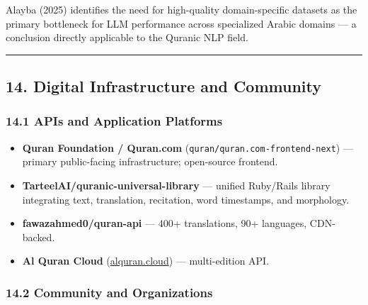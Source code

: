 \documentclass[12pt,a4paper]{article}
\providecommand{\tightlist}{\setlength{\itemsep}{0pt}\setlength{\parskip}{0pt}}
\begin{document}
Alayba (2025) identifies the need for high-quality domain-specific
datasets as the primary bottleneck for LLM performance across
specialized Arabic domains --- a conclusion directly applicable to the
Quranic NLP field.

\begin{center}\rule{0.5\linewidth}{0.5pt}\end{center}

\protect{}\label{s14}
\subsection{14. Digital Infrastructure and
Community}\label{digital-infrastructure-and-community}

\subsubsection{14.1 APIs and Application
Platforms}\label{apis-and-application-platforms}

\begin{itemize}
\tightlist
\item
  \textbf{Quran Foundation / Quran.com}
  (\texttt{quran/quran.com-frontend-next}) --- primary public-facing
  infrastructure; open-source frontend.
\item
  \textbf{TarteelAI/quranic-universal-library} --- unified Ruby/Rails
  library integrating text, translation, recitation, word timestamps,
  and morphology.
\item
  \textbf{fawazahmed0/quran-api} --- 400+ translations, 90+ languages,
  CDN-backed.
\item
  \textbf{Al Quran Cloud} (\href{https://alquran.cloud}{alquran.cloud})
  --- multi-edition API.
\end{itemize}

\subsubsection{14.2 Community and
Organizations}\label{community-and-organizations}
\end{document}

